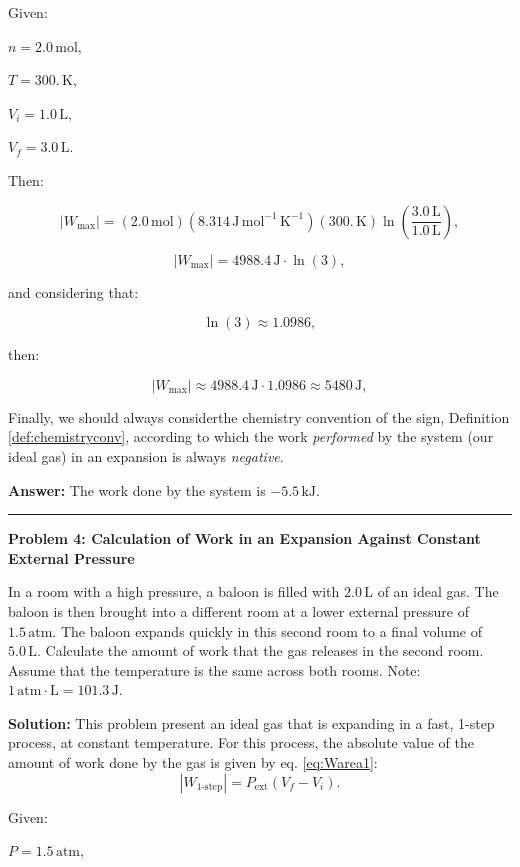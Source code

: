 \documentclass[
  9pt,
]{extbook}
\theoremstyle{definition}
\theoremstyle{definition}
\theoremstyle{definition}
\theoremstyle{definition}
\theoremstyle{remark}
\begin{document}
Given:

\(n=2.0\,\text{mol}\),

\(T=300.\,\text{K}\),

\(V_i=1.0\,\text{L}\),

\(V_f=3.0\,\text{L}\).

Then:

\[\left| W_{\text{max}} \right|=(2.0\,\text{mol})(8.314\,\text{J} \, \text{mol}^{-1} \, \text{K}^{-1})(300.\,\text{K})\ln\left(\frac{3.0\,\text{L}}{1.0\,\text{L}}\right),\]

\[\left| W_{\text{max}} \right|=4988.4\,\text{J}\cdot \ln(3),\]

and considering that:

\[\ln(3)\approx 1.0986,\]

then:

\[\left| W_{\text{max}} \right|\approx 4988.4\,\text{J} \cdot 1.0986 \approx 5480\,\text{J},\]

Finally, we should always considerthe chemistry convention of the sign, Definition \ref{def:chemistryconv}, according to which the work \emph{performed} by the system (our ideal gas) in an expansion is always \emph{negative}.

\textbf{Answer:} The work done by the system is \(-5.5\,\text{kJ}\).

\begin{center}\rule{0.5\linewidth}{0.5pt}\end{center}

\textbf{Problem 4: Calculation of Work in an Expansion Against Constant External Pressure}

In a room with a high pressure, a baloon is filled with \(2.0\,\text{L}\) of an ideal gas. The baloon is then brought into a different room at a lower external pressure of \(1.5\,\text{atm}\). The baloon expands quickly in this second room to a final volume of \(5.0\,\text{L}\). Calculate the amount of work that the gas releases in the second room. Assume that the temperature is the same across both rooms. Note: \(1 \,\text{atm}\cdotp\text{L} = 101.3\,\text{J}\).

\textbf{Solution:} This problem present an ideal gas that is expanding in a fast, 1-step process, at constant temperature. For this process, the absolute value of the amount of work done by the gas is given by eq. \eqref{eq:Warea1}: \[  \left| W_{\text{1-step}} \right| = P_{\text{ext}} (V_f-V_i).\]

Given:

\(P=1.5\,\text{atm}\),
\end{document}
